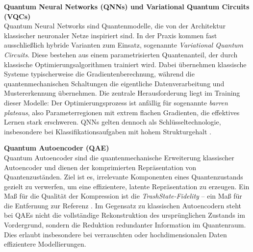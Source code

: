 \vspace{0.3cm}
\noindent
\textbf{Quantum Neural Networks (QNNs) und Variational Quantum Circuits (VQCs)}\\
\vspace{0.2cm}
Quantum Neural Networks sind Quantenmodelle, die von der Architektur klassischer neuronaler Netze inspiriert sind. In der Praxis kommen fast ausschließlich hybride Varianten zum Einsatz, sogenannte \textit{Variational Quantum Circuits}. Diese bestehen aus einem parametrisierten Quantenanteil, der durch klassische Optimierungsalgorithmen trainiert wird. Dabei übernehmen klassische Systeme typischerweise die Gradientenberechnung, während die quantenmechanischen Schaltungen die eigentliche Datenverarbeitung und Mustererkennung übernehmen. Die zentrale Herausforderung liegt im Training dieser Modelle: Der Optimierungsprozess ist anfällig für sogenannte \textit{barren plateaus}, also Parameterregionen mit extrem flachen Gradienten, die effektives Lernen stark erschweren. QNNs gelten dennoch als Schlüsseltechnologie, insbesondere bei Klassifikationsaufgaben mit hohem Strukturgehalt \cite{abbas2021}.  

\vspace{0.3cm}
\noindent
\textbf{Quantum Autoencoder (QAE)}\\
\vspace{0.2cm}
Quantum Autoencoder sind die quantenmechanische Erweiterung klassischer Autoencoder und dienen der komprimierten Repräsentation von Quantenzuständen. Ziel ist es, irrelevante Komponenten eines Quantenzustands gezielt zu verwerfen, um eine effizientere, latente Repräsentation zu erzeugen. Ein Maß für die Qualität der Kompression ist die \textit{TrashState-Fidelity} – ein Maß für die Entfernung zur Referenz \cite{ngairangbam_anomaly_2022}. Im Gegensatz zu klassischen Autoencodern steht bei QAEs nicht die vollständige Rekonstruktion des ursprünglichen Zustands im Vordergrund, sondern die Reduktion redundanter Information im Quantenraum. Dies erlaubt insbesondere bei verrauschten oder hochdimensionalen Daten effizientere Modellierungen. \cite{schuld_introduction_2015}

